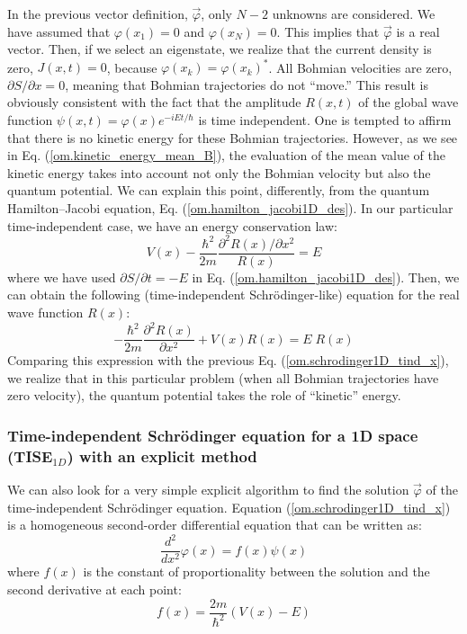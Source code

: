 \documentclass[onecolumn,nofootinbib, secnumarabic, amsmath, nobibnotes,12pt,aps,pra]{revtex4-1}
\newcommand{\eref}[1]{Eq. (\ref{#1})}
\newcommand{\Eref}[1]{Equation (\ref{#1})}
\begin{document}
In the previous vector definition, $\vec \varphi$, only $N - 2$ unknowns are considered. We have assumed that $\varphi(x_1) = 0$ and $\varphi(x_N) = 0$. This implies that $\vec \varphi$ is a real vector. Then, if we select an eigenstate,  we realize that the current density is zero, $J(x,t) = 0$, because $\varphi(x_k) = \varphi(x_k)^*$. All Bohmian velocities are zero, $\partial S/\partial x = 0$, meaning that Bohmian trajectories do not ``move.'' This result is obviously consistent with the fact that the amplitude $R(x,t)$ of the global wave function $\psi(x,t) = \varphi(x) e^{-iE t/\hbar}$ is time independent. One is tempted to affirm that there is no kinetic energy for these Bohmian trajectories. However, as we see in \eref{om.kinetic_energy_mean_B}, the evaluation of the mean value of the kinetic energy takes into account not only the Bohmian velocity but also the quantum potential. We can explain this point, differently, from the quantum Hamilton--Jacobi equation, \eref{om.hamilton_jacobi1D_des}. In our particular time-independent case, we have an energy conservation law:
\begin{equation*}
V(x) - \frac{\hbar^2} {2 m} \frac{{\partial}^2 R(x)/ \partial x^2} {R(x)} = E
\end{equation*}
where we have used $\partial S/\partial t = -E$ in \eref{om.hamilton_jacobi1D_des}. Then, we can obtain the following (time-independent Schr\"odinger-like) equation for the real wave function $R(x)$:
\begin{equation}
\label{om.schrodinger1D_tind_x_for R}
-\frac{\hbar^2} {2 m} \frac{{\partial}^2 R(x)} {\partial x^2} + V(x) R(x) = E \; R(x)
\end{equation}
Comparing this expression with the previous
\eref{om.schrodinger1D_tind_x}, we realize that in this particular
problem (when all Bohmian trajectories have zero velocity), the quantum
potential takes the role of ``kinetic'' energy.

\subsubsection{Time-independent Schr\"odinger equation for a 1D space (TISE$_{1D}$) with an explicit method}

We can also look for a very simple explicit algorithm to find the solution $\vec \varphi$ of the time-independent Schr\"odinger equation. \Eref{om.schrodinger1D_tind_x} is a homogeneous second-order differential equation that can be written as:
\begin{equation}
\frac{{d}^{2}}{d{x}^{2}}\varphi(x) = f(x)\psi (x)
\label{om.numerov1}
\end{equation}
where $f(x)$ is the constant of proportionality between the solution and the second derivative at each point:
\begin{equation}
f(x) = \frac{ 2 m} {{\hbar }^{2}}(V(x) - {E})
\end{equation}
\end{document}

